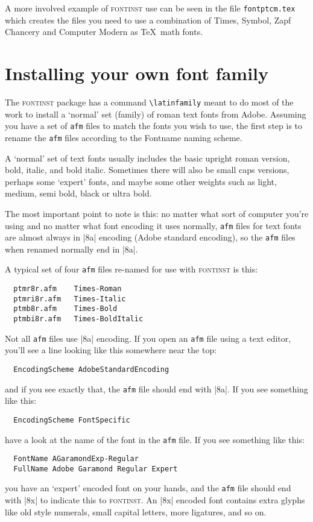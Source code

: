 \documentclass[a4paper]{ltxguide}
\newcommand*{\setfilename}[1]{\texttt{#1}}
\newcommand*{\setpackagename}[1]{\textsc{#1}}
\newcommand{\fontinst}{\setpackagename{font\-inst}\xspace}
\newcommand{\Fontnamekb}{Fontname\xspace}
\newcommand{\afm}{\setfilename{afm}\xspace}
\begin{document}
A more involved example of \fontinst use can be seen in the file
\texttt{fontptcm.tex} which creates the files you need to use a
combination of Times, Symbol, Zapf Chancery and Computer Modern as
\TeX\ math fonts.


\section{Installing your own font family}

The \fontinst package has a command \verb|\latinfamily| meant to
do most of the work to install a `normal' set (family) of roman
text fonts from Adobe.  Assuming you have a set of \afm files to
match the fonts you wish to use, the first step is to rename the
\afm files according to the \Fontnamekb naming scheme.

A `normal' set of text fonts usually includes the basic upright
roman version, bold, italic, and bold italic.  Sometimes there
will also be small caps versions, perhaps some `expert' fonts, and
maybe some other weights such as light, medium, semi bold, black
or ultra bold.

The most important point to note is this: no matter what sort of
computer you're using and no matter what font encoding it uses
normally, \afm files for text fonts are almost always in |8a|
encoding (Adobe standard encoding), so the \afm files when renamed
normally end in |8a|.

A typical set of four \afm files re-named for use with \fontinst
is this:
\begin{verbatim}
  ptmr8r.afm    Times-Roman
  ptmri8r.afm   Times-Italic
  ptmb8r.afm    Times-Bold
  ptmbi8r.afm   Times-BoldItalic
\end{verbatim}
Not all \afm files use |8a| encoding.  If you open an \afm file
using a text editor, you'll see a line looking like this somewhere
near the top:
\begin{verbatim}
  EncodingScheme AdobeStandardEncoding
\end{verbatim}
and if you see exactly that, the \afm file should end with |8a|.
If you see something like this:
\begin{verbatim}
  EncodingScheme FontSpecific
\end{verbatim}
have a look at the name of the font in the \afm file.  If you see
something like this:
\begin{verbatim}
  FontName AGaramondExp-Regular
  FullName Adobe Garamond Regular Expert
\end{verbatim}
you have an `expert' encoded font on your hands, and the \afm file
should end with |8x| to indicate this to \fontinst.  An |8x|
encoded font contains extra glyphs like old style numerals, small
capital letters, more ligatures, and so on.
\end{document}
